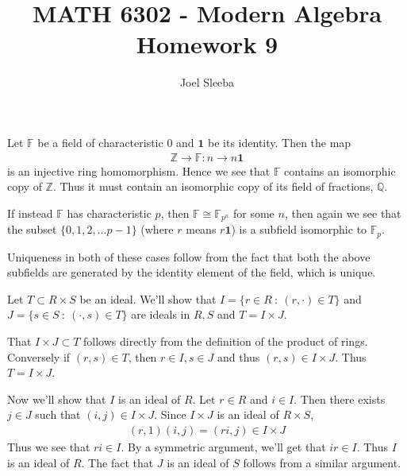 \documentclass[12pt]{exam}
\theoremstyle{plain} %
\theoremstyle{definition} %
\theoremstyle{remark} %
\begin{document}
\title{MATH 6302 - Modern Algebra\\ Homework  9}

\author{
  Joel Sleeba \\
}

\maketitle
\printanswers
\unframedsolutions
\begin{questions}

  \question
  \begin{solution}
    Let $\mathbb{F}$ be a field of characteristic $0$ and
    $\textbf{1}$ be its identity. Then the map
    \begin{align*}
      \mathbb{Z} \to \mathbb{F} : n \to n \textbf{1}
    \end{align*}
    is an injective ring homomorphism. Hence we see that $\mathbb{F}$
    contains an isomorphic copy of $\mathbb{Z}$. Thus it must contain
    an isomorphic copy of its field of fractions, $\mathbb{Q}$.

    If instead $\mathbb{F}$ has characteristic $p$, then $\mathbb{F}
    \cong \mathbb{F}_{p^n}$ for some $n$, then again we see that the
    subset $ \{ 0, 1, 2, \ldots p-1 \}$ (where $r$ means $r \textbf{1}$) is
    a subfield isomorphic to $\mathbb{F}_p$.

    Uniqueness in both of these cases follow from the fact that both
    the above subfields are generated by the identity element of the
    field, which is unique.
  \end{solution}

  \question
  \begin{solution}
    Let $T \subset R \times S$ be an ideal. We'll show that $I = \{ r
    \in R  \ : \ (r, \cdot) \in T  \}$ and $J = \{ s \in S \ :
    \  (\cdot, s) \in T \}$ are ideals in $R, S$ and $T = I \times J$.

    That $I \times J \subset T$ follows directly from the definition
    of the product of rings. Conversely if $(r, s) \in T$, then $r
    \in I, s\in J$ and thus $(r, s) \in I \times J$. Thus $T = I \times J$.

    Now we'll show that $I$ is an ideal of $R$. Let $r \in R$ and $i
    \in I$. Then there exists $j \in J$ such that $(i, j) \in I
    \times J$. Since $I \times J$ is an ideal of $R \times S$,
    \begin{align*}
      (r, 1)(i, j) = (ri, j) \in I \times J
    \end{align*}
    Thus we see that $ri \in I$. By a symmetric argument, we'll get
    that $ir \in I$. Thus $I$ is an ideal of $R$. The fact that $J$
    is an ideal of $S$ follows from a similar argument.
  \end{solution}


\end{questions}
\end{document}
